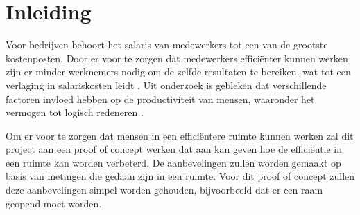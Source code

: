 \section{Inleiding} \label{sec:introduction}
Voor bedrijven behoort het salaris van medewerkers tot een van de grootste kostenposten. Door er voor te zorgen dat medewerkers efficiënter kunnen werken zijn er minder werknemers nodig om de zelfde resultaten te bereiken, wat tot een verlaging in salariskosten leidt \cite{al2016occupant}. Uit onderzoek is gebleken dat verschillende factoren invloed hebben op de productiviteit van mensen, waaronder het vermogen tot logisch redeneren \cite{wyon2006room}.

Om er voor te zorgen dat mensen in een efficiëntere ruimte kunnen werken zal dit project aan een proof of concept werken dat aan kan geven hoe de efficiëntie in een ruimte kan worden verbeterd. De aanbevelingen zullen worden gemaakt op basis van metingen die gedaan zijn in een ruimte. Voor dit proof of concept zullen deze aanbevelingen simpel worden gehouden, bijvoorbeeld dat er een raam geopend moet worden.
